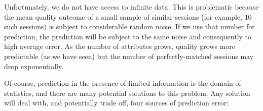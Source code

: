 Unfortunately, we do not have access to infinite data.  This is problematic because the mean quality outcome of a small sample of similar sessions (for example, $10$ such sessions) is subject to considerable random noise.  If we use that number for prediction, the prediction will be subject to the same noise and consequently to high average error.  As the number of attributes grows, quality grows more predictable (as we have seen) but the number of perfectly-matched sessions may drop exponentially.

Of course, prediction in the presence of limited information is the domain of statistics, and there are many potential solutions to this problem.  Any solution will deal with, and potentially trade off, four sources of prediction error:


\begin{figure}[h!]
\centering
{}
\label{fig:group-size-impact}
\end{figure}


